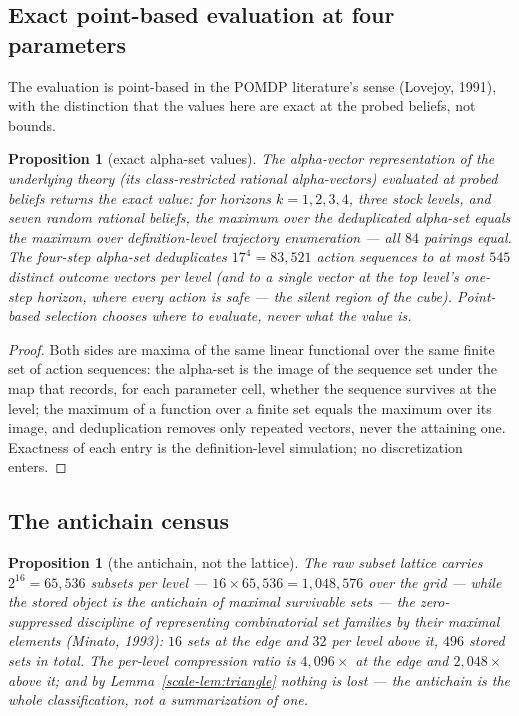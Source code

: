 \documentclass[10pt,twocolumn]{article}
\theoremstyle{plain}
\newtheorem{proposition}[theorem]{Proposition}
\theoremstyle{definition}
\theoremstyle{remark}
\begin{document}
\subsection{Exact point-based evaluation at four parameters}
\label{scale-pbvi}

The evaluation is point-based in the POMDP literature's sense
(Lovejoy, 1991), with the distinction that the values here are exact at
the probed beliefs, not bounds.

\begin{proposition}[exact alpha-set values]\label{scale-prop:pbvi}
The alpha-vector representation of the underlying theory (its
class-restricted rational alpha-vectors) evaluated at probed beliefs
returns the exact value: for horizons \(k = 1, 2, 3, 4\), three stock
levels, and seven random rational beliefs, the maximum over the
deduplicated alpha-set equals the maximum over definition-level
trajectory enumeration --- all \(84\) pairings equal. The four-step
alpha-set deduplicates \(17^{4} = 83{,}521\) action sequences to at
most \(545\) distinct outcome vectors per level (and to a single
vector at the top level's one-step horizon, where every action is
safe --- the silent region of the cube). Point-based selection
chooses where to evaluate, never what the value is.
\end{proposition}

\begin{proof}
Both sides are maxima of the same linear functional over the same
finite set of action sequences: the alpha-set is the image of the
sequence set under the map that records, for each parameter cell,
whether the sequence survives at the level; the maximum of a function
over a finite set equals the maximum over its image, and
deduplication removes only repeated vectors, never the attaining one.
Exactness of each entry is the definition-level simulation; no
discretization enters.
\end{proof}

\subsection{The antichain census}\label{scale-census}

\begin{proposition}[the antichain, not the lattice]\label{scale-prop:census}
The raw subset lattice carries \(2^{16} = 65{,}536\) subsets per
level --- \(16 \times 65{,}536 = 1{,}048{,}576\) over the grid ---
while the stored object is the antichain of maximal survivable sets --- the zero-suppressed
discipline of representing combinatorial set families by their maximal
elements (Minato, 1993):
\(16\) sets at the edge and \(32\) per level above it, \(496\) stored
sets in total. The per-level compression ratio is \(4{,}096\times\) at
the edge and \(2{,}048\times\) above it; and by
Lemma~\ref{scale-lem:triangle} nothing is lost --- the antichain is the
whole classification, not a summarization of one.
\end{proposition}
\end{document}

